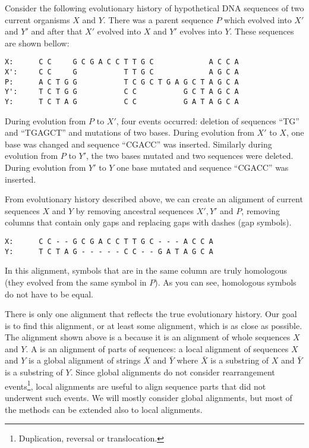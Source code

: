 \begin{example} 
Consider the  following evolutionary history of hypothetical DNA sequences of two
current organisms $X$ and $Y$. There was a parent sequence $P$ which evolved into
$X'$ and $Y'$ and after that $X'$ evolved into $X$ and $Y'$ evolves into $Y$.
These sequences are shown bellow: 
\begin{verbatim}
X:      C C     G C G A C C T T G C             A C C A
X':     C C     G           T T G C             A G C A
P:      A C T G G           T C G C T G A G C T A G C A
Y':     T C T G G           C C           G C T A G C A
Y:      T C T A G           C C           G A T A G C A
\end{verbatim}
During evolution from $P$ to $X'$, four events occurred: deletion of 
sequences ``TG''  and ``TGAGCT'' and mutations of two bases. During evolution
from $X'$ to $X$, one base was changed and sequence ``CGACC'' was inserted.  
Similarly during evolution from $P$ to $Y'$, the two bases mutated and two
sequences were deleted. During evolution from $Y'$ to $Y$ one base mutated and
sequence ``CGACC'' was inserted. 

From evolutionary history described above, we can create an alignment of current
sequences $X$ and $Y$ by removing ancestral sequences $X',Y'$ and $P$, 
removing columns that contain only gaps and
replacing gaps with dashes (gap symbols). 
\begin{verbatim}
X:      C C - - G C G A C C T T G C - - - A C C A
Y:      T C T A G - - - - - C C - - G A T A G C A
\end{verbatim}
In this alignment, symbols that are in the same column are truly homologous (they
evolved from the same symbol in $P$).
As you can see, homologous symbols do not have to be equal.
\end{example}

There is only one alignment that reflects the true evolutionary history. Our goal
is to find this alignment, or at least some alignment, which is as close as
possible. The alignment shown above is a  because it
is an alignment of whole sequences $X$ and $Y$. A 
is an alignment of parts of sequences: a local alignment of sequences $X$ and
$Y$ is a global alignment of strings $\bar{X}$ and $\bar{Y}$ where $\bar{X}$ is
a substring of $X$ and $\bar{Y}$ is a substring of $Y$.  Since global
alignments do not consider rearrangement events\footnote{Duplication, reversal
or translocation.}, local alignments are useful to align sequence parts that
did not underwent such events. We will mostly consider global alignments, but
most of the methods can be extended also to local alignments.


